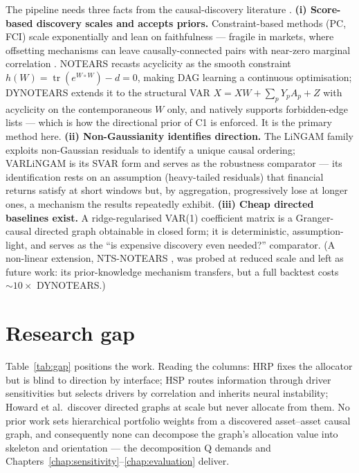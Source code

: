 The pipeline needs three facts from the causal-discovery literature
\cite{spirtes2000causation,kaddour2022causalml}. \textbf{(i) Score-based
discovery scales and accepts priors.} Constraint-based methods (PC, FCI) scale
exponentially and lean on faithfulness --- fragile in markets, where offsetting
mechanisms can leave causally-connected pairs with near-zero marginal
correlation \cite{howard2025causal}. NOTEARS \cite{zheng2018notears} recasts
acyclicity as the smooth constraint
$h(W)=\operatorname{tr}(e^{W\circ W})-d=0$, making DAG learning a continuous
optimisation; DYNOTEARS \cite{pamfil2020dynotears} extends it to the
structural VAR $X = XW + \sum_p Y_p A_p + Z$ with acyclicity on the
contemporaneous $W$ only, and natively supports forbidden-edge lists --- which
is how the directional prior of C1 is enforced. It is the primary method here.
\textbf{(ii) Non-Gaussianity identifies direction.} The LiNGAM family
\cite{shimizu2006lingam} exploits non-Gaussian residuals to identify a unique
causal ordering; VARLiNGAM \cite{hyvarinen2010varlingam} is its SVAR form and
serves as the robustness comparator --- its identification rests on an
assumption (heavy-tailed residuals) that financial returns satisfy at short
windows but, by aggregation, progressively lose at longer ones, a mechanism
the results repeatedly exhibit. \textbf{(iii) Cheap directed baselines
exist.} A ridge-regularised VAR(1) coefficient matrix is a
Granger-causal \cite{granger1969investigating} directed graph obtainable in
closed form; it is deterministic, assumption-light, and serves as the
``is expensive discovery even needed?'' comparator. (A non-linear extension,
NTS-NOTEARS \cite{sun2023ntsnotears}, was probed at reduced scale and left as
future work: its prior-knowledge mechanism transfers, but a full backtest
costs ${\sim}10\times$ DYNOTEARS.)

\section{Research gap}
\label{sec:gap}

Table~\ref{tab:gap} positions the work. Reading the columns: HRP fixes the
allocator but is blind to direction by interface; HSP routes information
through driver sensitivities but selects drivers by correlation and inherits
neural instability; Howard et al.\ discover directed graphs at scale but never
allocate from them. No prior work sets hierarchical portfolio weights from a
discovered asset--asset causal graph, and consequently none can decompose the
graph's allocation value into skeleton and orientation --- the decomposition
Q demands and Chapters~\ref{chap:sensitivity}--\ref{chap:evaluation} deliver.

